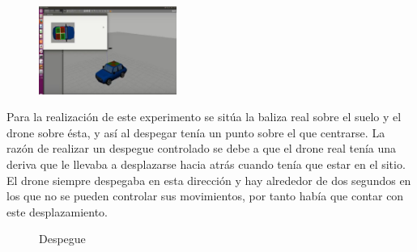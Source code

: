 \begin{figure}[H]
	\centering
		\includegraphics[width=0.4\textwidth]{imgs/TakeOff.jpg}
	\label{fig:Despegue sobre la baliza del coche.}
\end{figure}


\hspace{1cm} Para la realizaci\'on de este experimento se sit\'ua la baliza real sobre el suelo y el drone sobre \'esta, y as\'i al despegar ten\'ia un punto sobre el que centrarse. La raz\'on de realizar un despegue controlado se debe a que el drone real ten\'ia una deriva que le llevaba a desplazarse hacia atr\'as cuando ten\'ia que estar en el sitio. El drone siempre despegaba en esta direcci\'on y hay alrededor de dos segundos en los que no se pueden controlar sus movimientos, por tanto hab\'ia que contar con este desplazamiento. 

\begin{figure}[H]
 \centering
 \caption{Despegue}
 \label{f:Test Despegue}
\end{figure}

